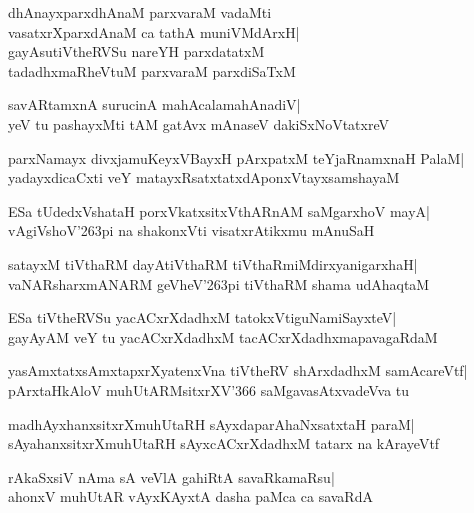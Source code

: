 \documentclass[twoside,12pt,openright]{book}
\def\S{\char'263}
\newcounter{shloka}[chapter]
\begin{document}
\begin{shloka}%
dhAnayxparxdhAnaM parxvaraM vadaMti\\
vasatxrXparxdAnaM ca tathA muniVMdArxH|\\
gayAsutiVtheRVSu nareYH parxdatatxM\\
tadadhxmaRheVtuM parxvaraM parxdiSaTxM
\end{shloka}

\begin{shloka}%
savARtamxnA surucinA mahAcalamahAnadiV|\\
yeV tu pashayxMti tAM gatAvx mAnaseV dakiSxNoVtatxreV
\end{shloka}

\begin{shloka}%
parxNamayx divxjamuKeyxVBayxH pArxpatxM teYjaRnamxnaH PalaM|\\
yadayxdicaCxti veY matayxRsatxtatxdAponxVtayxsamshayaM
\end{shloka}

\begin{shloka}%
ESa tUdedxVshataH porxVkatxsitxVthARnAM saMgarxhoV mayA|\\
vAgiVshoV\S pi na shakonxVti visatxrAtikxmu mAnuSaH
\end{shloka}

\begin{shloka}%
satayxM tiVthaRM dayAtiVthaRM tiVthaRmiMdirxyanigarxhaH|\\
vaNARsharxmANARM geVheV\S pi tiVthaRM shama udAhaqtaM
\end{shloka}

\begin{shloka}%
ESa tiVtheRVSu yacACxrXdadhxM tatokxVtiguNamiSayxteV|\\
gayAyAM veY tu yacACxrXdadhxM tacACxrXdadhxmapavagaRdaM 
\end{shloka}

\begin{shloka}%
yasAmxtatxsAmxtapxrXyatenxVna tiVtheRV shArxdadhxM samAcareVtf|\\
pArxtaHkAloV muhUtARMsitxrXV\char'366 saMgavasAtxvadeVva tu
\end{shloka}

\begin{shloka}%
madhAyxhanxsitxrXmuhUtaRH sAyxdaparAhaNxsatxtaH paraM|\\
sAyahanxsitxrXmuhUtaRH sAyxcACxrXdadhxM tatarx na kArayeVtf
\end{shloka}

\begin{shloka}%
rAkaSxsiV nAma sA veVlA gahiRtA savaRkamaRsu|\\
ahonxV muhUtAR vAyxKAyxtA dasha paMca ca savaRdA
\end{shloka}
\end{document}
